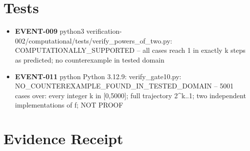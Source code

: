 \documentclass[11pt]{article}
\begin{document}
\section{Tests}
\begin{itemize}
\item \textbf{EVENT-009} python3 verification-002/computational/tests/verify\_powers\_of\_two.py: COMPUTATIONALLY\_SUPPORTED -- all cases reach 1 in exactly k steps as predicted; no counterexample in tested domain
\item \textbf{EVENT-011} python Python 3.12.9: verify\_gate10.py: NO\_COUNTEREXAMPLE\_FOUND\_IN\_TESTED\_DOMAIN -- 5001 cases over: every integer k in [0,5000]; full trajectory 2\textasciicircum{}k..1; two independent implementations of f; NOT PROOF
\end{itemize}
\section{Evidence Receipt}
\end{document}
